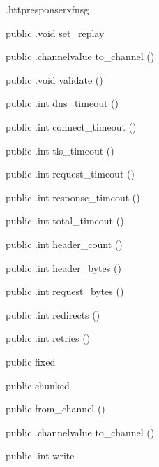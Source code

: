 \begin{CrexxClass}{.httpresponse}{rxfnsg}
\begin{Members}
    \Method
      {public}
      {.void}
      {set\_replay}
      {}

    \Method
      {public}
      {.channelvalue}
      {to\_channel}
      {()}

    \Method
      {public}
      {.void}
      {validate}
      {()}

    \Method
      {public}
      {.int}
      {dns\_timeout}
      {()}

    \Method
      {public}
      {.int}
      {connect\_timeout}
      {()}

    \Method
      {public}
      {.int}
      {tls\_timeout}
      {()}

    \Method
      {public}
      {.int}
      {request\_timeout}
      {()}

    \Method
      {public}
      {.int}
      {response\_timeout}
      {()}

    \Method
      {public}
      {.int}
      {total\_timeout}
      {()}

    \Method
      {public}
      {.int}
      {header\_count}
      {()}

    \Method
      {public}
      {.int}
      {header\_bytes}
      {()}

    \Method
      {public}
      {.int}
      {request\_bytes}
      {()}

    \Method
      {public}
      {.int}
      {redirects}
      {()}

    \Method
      {public}
      {.int}
      {retries}
      {()}

    \Factory
      {public}
      {fixed}
      {}

    \Factory
      {public}
      {chunked}
      {}

    \Factory
      {public}
      {from\_channel}
      {()}

    \Method
      {public}
      {.channelvalue}
      {to\_channel}
      {()}

    \Method
      {public}
      {.int}
      {write}
      {}


\end{Members}
\end{CrexxClass}
